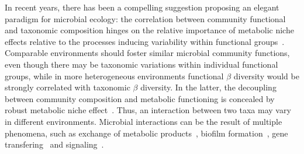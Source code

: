 \documentclass[sn-mathphys,Numbered, lineno]{sn-jnl}  %
\theoremstyle{thmstyleone}%
\theoremstyle{thmstyletwo}%
\theoremstyle{thmstylethree}%
\begin{document}
    In recent years, there has been a compelling suggestion proposing an elegant paradigm for microbial ecology: 
    the correlation between community functional and taxonomic composition hinges on the relative importance of metabolic niche effects relative to the processes inducing variability within functional groups~\cite{louca2016high}.
    Comparable environments should foster similar microbial community functions, even though there may be taxonomic variations within individual functional groups, 
    while in more heterogeneous environments functional $\beta$ diversity would be strongly correlated with taxonomic $\beta$ diversity.
    In the latter, the decoupling between community composition and metabolic functioning is concealed by robust metabolic niche effect~\cite{louca2016high}.
    Thus, an interaction between two taxa may vary in different environments.
    Microbial interactions can be the result of multiple phenomena, such as exchange of metabolic products~\cite{kost2023metabolic}, biofilm formation~\cite{arnaouteli2021bacillus}, gene transfering~\cite{de2023horizontal} and signaling~\cite{keller2006communication}.
\end{document}
